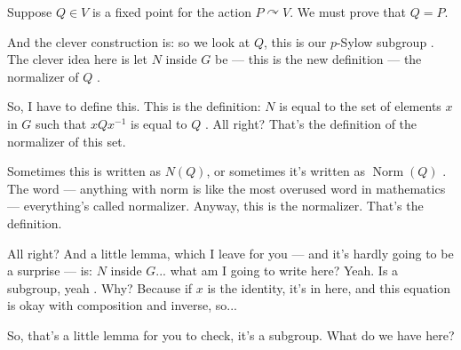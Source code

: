 \begin{proofWrapper}
\begin{content}
Suppose $Q \in V$ is a fixed point for the action $P \curvearrowright V$. We must prove that $Q = P$.
\end{content}

\begin{speech}[00:10:21 - 00:11:22]
And the clever construction is: so we look at $Q$, this is our $p$-Sylow subgroup . The clever idea here is let $N$ inside $G$ be --- this is the new definition --- the normalizer of $Q$ .

So, I have to define this. This is the definition: $N$ is equal to the set of elements $x$ in $G$ such that $x Q x^{-1}$ is equal to $Q$ . All right? That's the definition of the normalizer of this set.

Sometimes this is written as $N(Q)$, or sometimes it's written as $\operatorname{Norm}(Q)$ . The word  --- anything with norm is like the most overused word in mathematics --- everything's called normalizer. Anyway, this is the normalizer. That's the definition.
\end{speech}

\begin{content}
\end{content}

\begin{speech}[00:11:22 - 00:12:10]
All right? And a little lemma, which I leave for you --- and it's hardly going to be a surprise --- is: $N$ inside $G$...  what am I going to write here?  Yeah. Is a subgroup, yeah . Why? Because if $x$ is the identity, it's in here, and this equation is okay with composition and inverse, so...

So, that's a little lemma for you to check, it's a subgroup. What do we have here?


\end{speech}
\end{proofWrapper}
